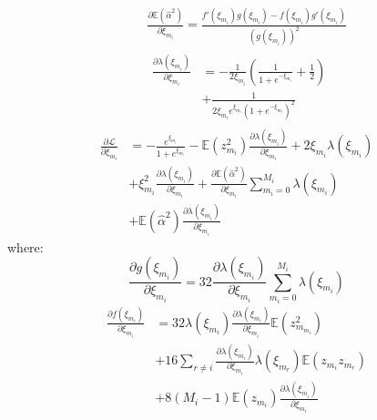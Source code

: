 \documentclass[review]{elsarticle}
\begin{document}
\begin{eqnarray*}
&& \frac{\partial \mathbb{E}(\hat{\alpha}^{2})}{\partial \xi_{m_{i}}} = \frac{f'(\xi_{m_{i}})g(\xi_{m_{i}}) - f(\xi_{m_{i}})g'(\xi_{m_{i}})}{(g(\xi_{m_{i}}))^{2}}\\
&& 
\begin{aligned}
\frac{\partial \lambda(\xi_{m_{i}})}{\partial \xi_{m_{i}}} & = -\frac{1}{2\xi_{m_{i}}}(\frac{1}{1 + e^{-\xi_{m_{i}}}} + \frac{1}{2})\\
& + \frac{1}{2\xi_{m_{i}}e^{\xi_{m_{i}}}(1+e^{-\xi_{m_{i}}})^{2}}
\end{aligned}
\end{eqnarray*}
\begin{equation*}
\begin{aligned}
\frac{\partial \mathcal{L}}{\partial \xi_{m_{i}}} & = -\frac{e^{\xi_{m_{i}}}}{1 + e^{\xi_{m_{i}}}} - \mathbb{E}(z_{m_{i}}^{2})\frac{\partial \lambda(\xi_{m_{i}})}{\partial \xi_{m_{i}}} + 2\xi_{m_{i}}\lambda(\xi_{m_{i}}) \\
& + \xi_{m_{i}}^{2}\frac{\partial \lambda(\xi_{m_{i}})}{\partial \xi_{m_{i}}}    + \frac{\partial \mathbb{E}(\hat{\alpha}^{2})}{\partial \xi_{m_{i}}}\sum_{m_{i} = 0}^{M_{i}}\lambda(\xi_{m_{i}})\\
& + \mathbb{E}(\hat{\alpha}^{2})\frac{\partial \lambda(\xi_{m_{i}})}{\partial \xi_{m_{i}}}
\end{aligned}
\end{equation*}
\noindent where:
\begin{equation*}
\frac{\partial g(\xi_{m_{i}})}{\partial \xi_{m_{i}}} = 32\frac{\partial \lambda(\xi_{m_{i}})}{\partial \xi_{m_{i}}}\sum_{m_{i} = 0}^{M_{i}}\lambda(\xi_{m_{i}})
\end{equation*}
\begin{equation*}
  \begin{aligned}
\frac{\partial f(\xi_{m_{i}})}{\partial \xi_{m_{i}}} & = 32\lambda(\xi_{m_{i}})\frac{\partial \lambda(\xi_{m_{i}})}{\partial \xi_{m_{i}}}\mathbb{E}(z_{m_{m_{i}}}^{2}) \\
& + 16\sum_{r \neq i}\frac{\partial \lambda(\xi_{m_{i}})}{\partial \xi_{m_{i}}}\lambda(\xi_{m_{r}})\mathbb{E}(z_{m_{i}}z_{m_{r}}) \\
& + 8(M_{i} - 1)\mathbb{E}(z_{m_{i}})\frac{\partial \lambda(\xi_{m_{i}})}{\partial \xi_{m_{i}}}
\end{aligned}
\end{equation*}
\end{document}
